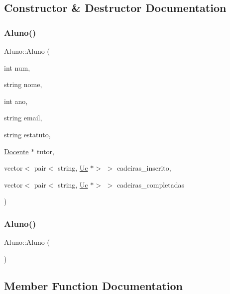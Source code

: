 \subsection{Constructor \& Destructor Documentation}
\hypertarget{class_aluno_ab7ed0488b4fe0366a8db56f5773d7809}{}\label{class_aluno_ab7ed0488b4fe0366a8db56f5773d7809} 
\subsubsection{\texorpdfstring{Aluno()}{Aluno()}\hspace{0.1cm}{\footnotesize\ttfamily [1/2]}}
{\footnotesize\ttfamily Aluno\+::\+Aluno (\begin{DoxyParamCaption}\item[{int}]{num,  }\item[{string}]{nome,  }\item[{int}]{ano,  }\item[{string}]{email,  }\item[{string}]{estatuto,  }\item[{\hyperlink{class_docente}{Docente} $\ast$}]{tutor,  }\item[{vector$<$ pair$<$ string, \hyperlink{class_uc}{Uc} $\ast$$>$ $>$}]{cadeiras\+\_\+inscrito,  }\item[{vector$<$ pair$<$ string, \hyperlink{class_uc}{Uc} $\ast$$>$ $>$}]{cadeiras\+\_\+completadas }\end{DoxyParamCaption})}

\hypertarget{class_aluno_ad5106d0f7834762fbe5f71f908144336}{}\label{class_aluno_ad5106d0f7834762fbe5f71f908144336} 
\subsubsection{\texorpdfstring{Aluno()}{Aluno()}\hspace{0.1cm}{\footnotesize\ttfamily [2/2]}}
{\footnotesize\ttfamily Aluno\+::\+Aluno (\begin{DoxyParamCaption}{ }\end{DoxyParamCaption})}



\subsection{Member Function Documentation}
\hypertarget{class_aluno_a632f91e407309ff24b5e1ee20c2d8daf}{}\label{class_aluno_a632f91e407309ff24b5e1ee20c2d8daf} 
